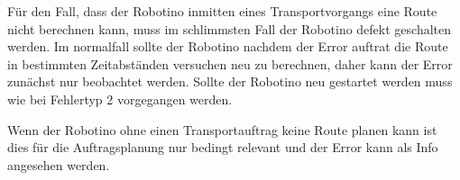 Für den Fall, dass der Robotino inmitten eines Transportvorgangs eine Route nicht berechnen kann, muss im schlimmsten Fall der Robotino defekt geschalten werden. Im normalfall sollte der Robotino nachdem der Error auftrat die Route in bestimmten Zeitabständen versuchen neu zu berechnen, daher kann der Error zunächst nur beobachtet werden. Sollte der Robotino neu gestartet werden muss wie bei Fehlertyp 2 vorgegangen werden. 

Wenn der Robotino ohne einen Transportauftrag keine Route planen kann ist dies für die Auftragsplanung nur bedingt relevant und der Error kann als Info angesehen werden. 

